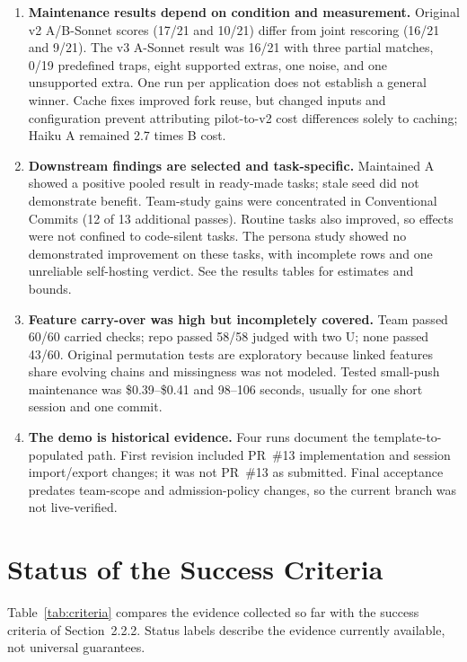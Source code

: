 \begin{enumerate}[nosep]
  \item \textbf{Maintenance results depend on condition and measurement.} Original v2 A/B-Sonnet scores (17/21 and 10/21) differ from joint rescoring (16/21 and 9/21). The v3 A-Sonnet result was 16/21 with three partial matches, 0/19 predefined traps, eight supported extras, one noise, and one unsupported extra. One run per application does not establish a general winner. Cache fixes improved fork reuse, but changed inputs and configuration prevent attributing pilot-to-v2 cost differences solely to caching; Haiku A remained 2.7 times B cost.
  \item \textbf{Downstream findings are selected and task-specific.} Maintained A showed a positive pooled result in ready-made tasks; stale seed did not demonstrate benefit. Team-study gains were concentrated in Conventional Commits (12 of 13 additional passes). Routine tasks also improved, so effects were not confined to code-silent tasks. The persona study showed no demonstrated improvement on these tasks, with incomplete rows and one unreliable self-hosting verdict. See the results tables for estimates and bounds.
  \item \textbf{Feature carry-over was high but incompletely covered.} Team passed 60/60 carried checks; repo passed 58/58 judged with two U; none passed 43/60. Original permutation tests are exploratory because linked features share evolving chains and missingness was not modeled. Tested small-push maintenance was \$0.39--\$0.41 and 98--106 seconds, usually for one short session and one commit.
  \item \textbf{The demo is historical evidence.} Four runs document the template-to-populated path. First revision  included PR~\#13 implementation and session import/export changes; it was not PR~\#13 as submitted. Final acceptance  predates team-scope and admission-policy changes, so the current branch was not live-verified.
\end{enumerate}

\section{Status of the Success Criteria}

Table~\ref{tab:criteria} compares the evidence collected so far with the success criteria of Section~2.2.2. Status labels describe the evidence currently available, not universal guarantees.


